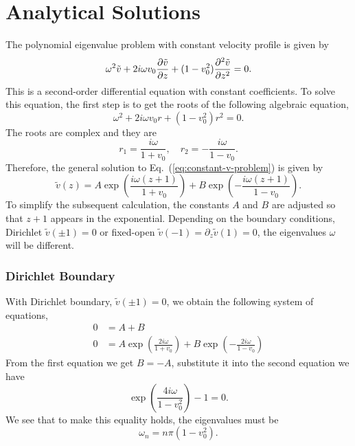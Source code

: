\chapter{Analytical Solutions} \label{chap:analytical-solutions}
The polynomial eigenvalue problem with constant velocity profile is given by
\begin{equation}
	\omega^2\tilde{v} + 2i\omega v_0\pdv{\tilde{v}}{z} + (1-v_0^2)\pdv[2]{\tilde{v}}{z} = 0.
	\label{eq:constant-v-problem}
\end{equation}
This is a second-order differential equation with constant coefficients. To solve this equation, the first step is to get the roots of the following algebraic equation,
\begin{equation}
	\omega^2 + 2i\omega v_0 r + (1-v_0^2)r^2 = 0.
\end{equation}
The roots are complex and they are
\begin{equation}
	r_1 = \frac{i\omega}{1+v_0}, \quad r_2=-\frac{i\omega}{1-v_0}.
\end{equation}
Therefore, the general solution to Eq.~(\ref{eq:constant-v-problem}) is given by
\begin{equation}
	\tilde{v}(z) = A\exp(\frac{i\omega(z+1)}{1+v_0}) + B\exp(-\frac{i\omega(z+1)}{1-v_0}).
\end{equation}
To simplify the subsequent calculation, the constants $A$ and $B$ are adjusted so that $z+1$ appears in the exponential. Depending on the boundary conditions, Dirichlet $\tilde{v}(\pm 1) = 0$ or fixed-open $\tilde{v}(-1)=\partial_z\tilde{v}(1)=0$, the eigenvalues $\omega$ will be different.

\subsection*{Dirichlet Boundary}
With Dirichlet boundary, $\tilde{v}(\pm 1)=0$, we obtain the following system of equations,
\begin{align*}
	0 & = A + B                                                          \\
	0 & = A\exp(\frac{2i\omega}{1+v_0}) + B\exp(-\frac{2i\omega}{1-v_0})
\end{align*}
From the first equation we get $B = -A$, substitute it into the second equation we have
\begin{equation}
	\exp(\frac{4i\omega}{1-v_0^2}) - 1 = 0.
\end{equation}
We see that to make this equality holds, the eigenvalues must be
\begin{equation}
	\omega_n = n\pi(1-v_0^2).
\end{equation}

